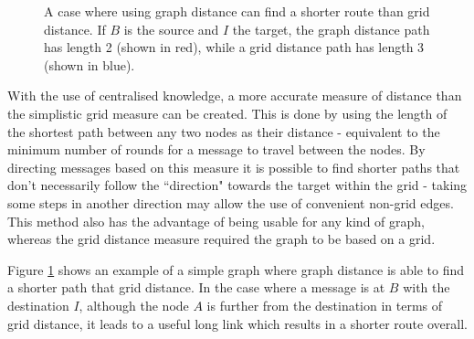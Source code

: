 \documentclass[bsc,frontabs,twoside,singlespacing,parskip,deptreport]{infthesis}     %
\begin{document}
\begin{figure}
\centering
{}
\caption{A case where using graph distance can find a shorter route than grid distance. If $B$ is the source and $I$ the target, the graph distance path has length 2 (shown in red), while a grid distance path has length 3 (shown in blue).}
\label{fig:graph_dist_example}
\end{figure}

With the use of centralised knowledge, a more accurate measure of distance than the simplistic grid measure can be created. This is done by using the length of the shortest path between any two nodes as their distance - equivalent to the minimum number of rounds for a message to travel between the nodes. By directing messages based on this measure it is possible to find shorter paths that don't necessarily follow the ``direction" towards the target within the grid - taking some steps in another direction may allow the use of convenient non-grid edges. This method also has the advantage of being usable for any kind of graph, whereas the grid distance measure required the graph to be based on a grid.

Figure \ref{fig:graph_dist_example} shows an example of a simple graph where graph distance is able to find a shorter path that grid distance. In the case where a message is at $B$ with the destination $I$, although the node $A$ is further from the destination in terms of grid distance, it leads to a useful long link which results in a shorter route overall.
\end{document}
